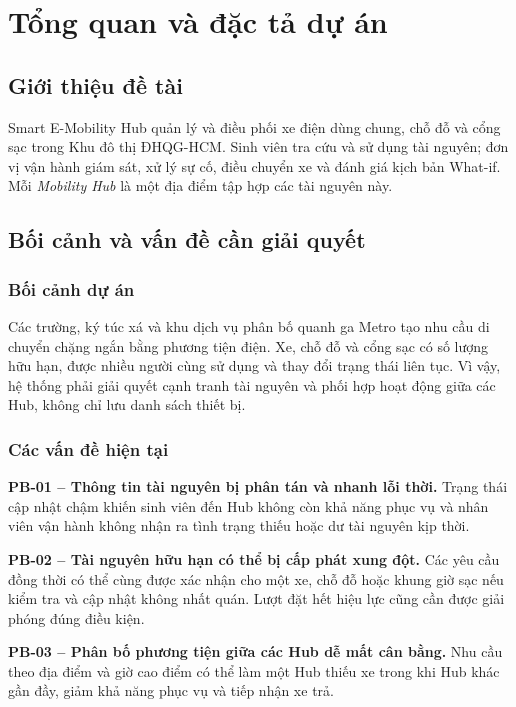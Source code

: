 \section{Tổng quan và đặc tả dự án}

\subsection{Giới thiệu đề tài}

Smart E-Mobility Hub quản lý và điều phối xe điện dùng chung, chỗ đỗ và cổng sạc trong Khu đô thị ĐHQG-HCM. Sinh viên tra cứu và sử dụng tài nguyên; đơn vị vận hành giám sát, xử lý sự cố, điều chuyển xe và đánh giá kịch bản What-if. Mỗi \textit{Mobility Hub} là một địa điểm tập hợp các tài nguyên này.

\subsection{Bối cảnh và vấn đề cần giải quyết}

\subsubsection*{Bối cảnh dự án}

Các trường, ký túc xá và khu dịch vụ phân bố quanh ga Metro tạo nhu cầu di chuyển chặng ngắn bằng phương tiện điện. Xe, chỗ đỗ và cổng sạc có số lượng hữu hạn, được nhiều người cùng sử dụng và thay đổi trạng thái liên tục. Vì vậy, hệ thống phải giải quyết cạnh tranh tài nguyên và phối hợp hoạt động giữa các Hub, không chỉ lưu danh sách thiết bị.

\subsubsection*{Các vấn đề hiện tại}

\noindent\textbf{PB-01 -- Thông tin tài nguyên bị phân tán và nhanh lỗi thời.}
Trạng thái cập nhật chậm khiến sinh viên đến Hub không còn khả năng phục vụ và nhân viên vận hành không nhận ra tình trạng thiếu hoặc dư tài nguyên kịp thời.

\medskip
\noindent\textbf{PB-02 -- Tài nguyên hữu hạn có thể bị cấp phát xung đột.}
Các yêu cầu đồng thời có thể cùng được xác nhận cho một xe, chỗ đỗ hoặc khung giờ sạc nếu kiểm tra và cập nhật không nhất quán. Lượt đặt hết hiệu lực cũng cần được giải phóng đúng điều kiện.

\medskip
\noindent\textbf{PB-03 -- Phân bố phương tiện giữa các Hub dễ mất cân bằng.}
Nhu cầu theo địa điểm và giờ cao điểm có thể làm một Hub thiếu xe trong khi Hub khác gần đầy, giảm khả năng phục vụ và tiếp nhận xe trả.


